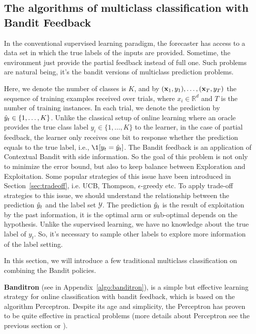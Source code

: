 \subsection{The algorithms of multiclass classification with Bandit Feedback}
\label{subsec:multiclassBF}
In the conventional supervised learning paradigm, the forecaster has access to a data set in which the true labels of the inputs are provided. Sometime, the environment just provide the partial feedback instead of full one. Such problems are natural being,  it's the bandit versions of multiclass prediction problems. 

Here, we denote the number of classes is $K$, and by $(\mathbf{x}_1,y_1),\dots,(\mathbf{x}_T,y_T)$  the sequence of training examples received over trials, where $x_i\in \mathbb{R}^d$ and $T$ is the number of training instances. In each trial, we denote the prediction by $\hat{y}_t\in \{1,\dots,K\}$. Unlike the classical setup of online learning where an oracle provides the true class label $y_i\in \{1,\dots,K\} $ to the learner, in the case of partial feedback, the learner only receives one bit to response whether the prediction equals to the true label, i.e., $\1[y_t = \hy]$. The Bandit feedback is an application of Contextual Bandit with side information. 
So the goal of this problem is not only to minimize the error bound, but also to keep balance between Exploration and Exploitation. Some popular strategies of this issue have been introduced in Section~\ref{sec:tradeoff}, i.e. UCB, Thompson, $\epsilon$-greedy etc.  To apply trade-off strategies to this issue, we should understand the relationship between the prediction $\hat{y}_t$ and the label set $\mathscr{Y}$. The prediction $\hat{y}_t$ is the result of exploitation by the past information, it is the optimal arm or sub-optimal depends on the hypothesis. Unlike the supervised learning, we have no knowledge about the true label of $y_t$. So, it's necessary to sample other labels to explore more information of the label setting.

In this section, we will introduce a few traditional multiclass classification on combining the Bandit policies. 
 
\vspace{3ex}
\textbf{Banditron} \cite{kakade2008efficient} (see in Appendix~\ref{algo:banditron}), is a simple but effective learning strategy for online classification with bandit feedback, which is based on the algorithm Perceptron. Despite its age and simplicity, the Perceptron has proven to be quite effective in practical problems (more details about Perceptron see the previous section or \cite{rosenblatt1958perceptron} ). 
 
